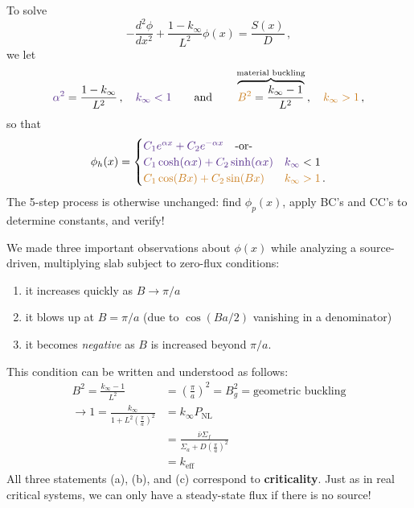\documentclass[compact]{ne630handout}
\begin{document}
\begin{handoutflow}


To solve
\begin{equation*}
  - \frac{d^2 \phi}{dx^2} + \frac{1 - k_{\infty}}{L^2} \phi(x) = \frac{S(x)}{D} \, ,
\end{equation*}
we let
\begin{align*}
 \textcolor{wcprimary}{\alpha^2} =  \frac{1-k_{\infty}}{L^2} \, , \quad \textcolor{wcprimary}{k_{\infty} < 1}
 \qquad \text{and} \qquad
 \overbrace{\textcolor{wcalerted}{B^2} =  \frac{k_{\infty}-1}{L^2}}^{\text{material buckling}} \, , \quad  \textcolor{wcalerted}{k_{\infty} > 1} \, ,
\end{align*}
so that
\begin{align*}
 \phi_h(x) =
 \begin{cases}
  \textcolor{wcprimary}{C_1 e^{\alpha x} + C_2 e^{-\alpha x}} \quad \text{-or-} & \\
  \textcolor{wcprimary}{  C_1 \cosh(\alpha x) + C_2 \sinh(\alpha x)} & \textcolor{wcprimary}{k_{\infty}} < 1 \\
   \textcolor{wcalerted}{ C_1 \cos(B x) + C_2 \sin(B x)} & \textcolor{wcalerted}{ k_{\infty} > 1} \, .
 \end{cases}
\end{align*}
The 5-step process is otherwise unchanged: find $\phi_p(x)$,
apply BC's and CC's to determine constants, and verify!

We made three important observations about $\phi(x)$ while analyzing a source-driven,
multiplying slab subject to zero-flux conditions:
\begin{enumerate}
 \item it increases quickly as $B \to \pi/a$
 \item it blows up at $B = \pi/a$ (due to $\cos(Ba/2)$ vanishing in a denominator)
 \item it becomes {\it negative} as $B$ is increased beyond $\pi/a$.
\end{enumerate}

This condition can be written and understood as follows:
\begin{align*}
 B^2  = \frac{k_{\infty}-1}{L^2} &= \left ( \frac{\pi}{a} \right )^2 = B_g^2 = \text{geometric buckling} \\
 \tag{a}
 \longrightarrow 1 = \frac{k_{\infty}}{1 + L^2  \left ( \frac{\pi}{a} \right )^2}
                   &= k_{\infty} P_{\text{NL}} \\
 \tag{b}
                   &= \frac{\bar{\nu}\Sigma_f}{\Sigma_a + D  \left ( \frac{\pi}{a} \right )^2 } \\
 \tag{c}
                   &= k_{\text{eff}}
\end{align*}
All three statements (a), (b), and (c) correspond to {\bf criticality}.  Just as in real critical
systems, we can only have a steady-state flux if there is no source!


\end{handoutflow}
\end{document}
